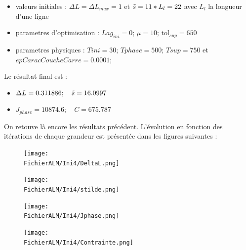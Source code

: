 \documentclass[11pt,a4paper]{article}
\begin{document}
\begin{itemize}
	\item valeurs initiales : $\Delta L=\Delta L_{max}=1$ et $\tilde{s}=11*L_l=22$ avec $L_l$ la longueur d'une ligne
	\item parametres d'optimisation : $Lag_{ini}=0$; $\mu=10$; $\textrm{tol}_{sup}=650$
	\item parametres physiques : $Tini=30;\,Tphase=500;\,Tsup=750$ et $epCaracCoucheCarre=0.0001;$
\end{itemize}

Le résultat final est :
\begin{itemize}
	\item $\Delta L= 0.311886;\quad \tilde{s}=16.0997$
	\item $J_{phase}=10874.6;\quad C= 675.787$
\end{itemize}

On retouve là encore les résultats précédent.
L'évolution en fonction des itérations de chaque grandeur est présentée dans les figures suivantes :

\begin{figure}[H]
	\begin{minipage}{0.45\textwidth}
		\centering
		\texttt{[image: \\FichierALM/Ini4/DeltaL.png]}
	\end{minipage}
	\begin{minipage}{0.45\textwidth}
		\centering
		\texttt{[image: \\FichierALM/Ini4/stilde.png]}
	\end{minipage}	
\end{figure}

\begin{figure}[H]
	\begin{minipage}{0.45\textwidth}
		\centering
		\texttt{[image: \\FichierALM/Ini4/Jphase.png]}
	\end{minipage}
	\begin{minipage}{0.45\textwidth}
		\centering
		\texttt{[image: \\FichierALM/Ini4/Contrainte.png]}
	\end{minipage}	
\end{figure}

\setcounter{x}{0}
\end{document}
